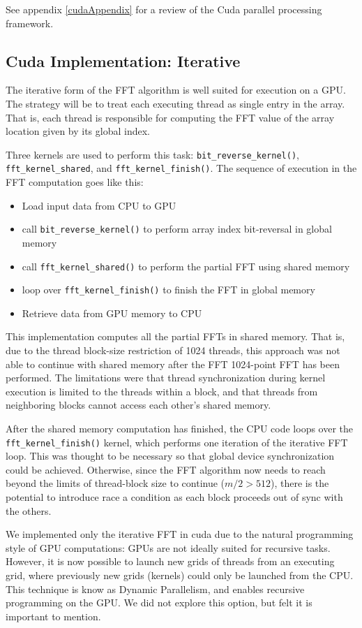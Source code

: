 See appendix \ref{cudaAppendix} for a review of the Cuda parallel processing framework.
\subsection{Cuda Implementation: Iterative}
The iterative form of the FFT algorithm is well suited for execution on a GPU. The strategy will be to treat each executing thread as single entry in the array. That is, each thread is responsible for computing the FFT value of the array location given by its global index. 

Three kernels are used to perform this task: \texttt{bit\_reverse\_kernel()}, \texttt{fft\_kernel\_shared}, and \texttt{fft\_kernel\_finish()}. The sequence of execution in the FFT computation goes like this:
\begin{itemize}
    \item Load input data from CPU to GPU
    \item call \texttt{bit\_reverse\_kernel()} to perform array index bit-reversal in global memory
    \item call \texttt{fft\_kernel\_shared()} to perform the partial FFT using shared memory
    \item loop over \texttt{fft\_kernel\_finish()} to finish the FFT in global memory
    \item Retrieve data from GPU memory to CPU
\end{itemize}

This implementation computes all the partial FFTs in shared memory. That is, due to the thread block-size restriction of 1024 threads, this approach was not able to continue with shared memory after the FFT 1024-point FFT has been performed. The limitations were that thread synchronization during kernel execution is limited to the threads within a block, and that threads from neighboring blocks cannot access each other's shared memory.

After the shared memory computation has finished, the CPU code loops over the \texttt{fft\_kernel\_finish()} kernel, which performs one iteration of the iterative FFT loop. This was thought to be necessary so that global device synchronization could be achieved. Otherwise, since the FFT algorithm now needs to reach beyond the limits of thread-block size to continue ($m/2 > 512$), there is the potential to introduce race a condition as each block proceeds out of sync with the others. 

We implemented only the iterative FFT in cuda due to the natural programming style of GPU computations: GPUs are not ideally suited for recursive tasks. However, it is now possible to launch new grids of threads from an executing grid, where previously new grids (kernels) could only be launched from the CPU. This technique is know as Dynamic Parallelism, and enables recursive programming on the GPU. We did not explore this option, but felt it is important to mention.

